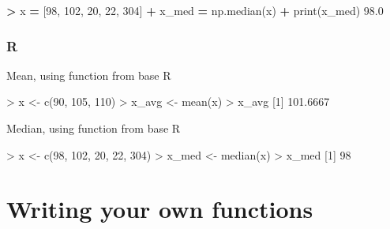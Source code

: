 \documentclass[
]{book}
\newenvironment{Shaded}{\begin{snugshade}}{\end{snugshade}}
\newcommand{\BuiltInTok}[1]{#1}
\newcommand{\DecValTok}[1]{\textcolor[rgb]{0.00,0.00,0.81}{#1}}
\newcommand{\FloatTok}[1]{\textcolor[rgb]{0.00,0.00,0.81}{#1}}
\newcommand{\FunctionTok}[1]{\textcolor[rgb]{0.00,0.00,0.00}{#1}}
\newcommand{\NormalTok}[1]{#1}
\newcommand{\OperatorTok}[1]{\textcolor[rgb]{0.81,0.36,0.00}{\textbf{#1}}}
\newcommand{\OtherTok}[1]{\textcolor[rgb]{0.56,0.35,0.01}{#1}}
\newcommand{\SpecialCharTok}[1]{\textcolor[rgb]{0.00,0.00,0.00}{#1}}
\begin{document}
\begin{Shaded}
\begin{Highlighting}[]
\OperatorTok{\textgreater{}}\NormalTok{ x }\OperatorTok{=}\NormalTok{ [}\DecValTok{98}\NormalTok{, }\DecValTok{102}\NormalTok{, }\DecValTok{20}\NormalTok{, }\DecValTok{22}\NormalTok{, }\DecValTok{304}\NormalTok{]}
\OperatorTok{+}\NormalTok{ x\_med }\OperatorTok{=}\NormalTok{ np.median(x)}
\OperatorTok{+} \BuiltInTok{print}\NormalTok{(x\_med)}
\FloatTok{98.0}
\end{Highlighting}
\end{Shaded}

\hypertarget{r-6}{%
\subsubsection*{R}\label{r-6}}

Mean, using function from base R

\begin{Shaded}
\begin{Highlighting}[]
\SpecialCharTok{\textgreater{}}\NormalTok{ x }\OtherTok{\textless{}{-}} \FunctionTok{c}\NormalTok{(}\DecValTok{90}\NormalTok{, }\DecValTok{105}\NormalTok{, }\DecValTok{110}\NormalTok{)}
\SpecialCharTok{\textgreater{}}\NormalTok{ x\_avg }\OtherTok{\textless{}{-}} \FunctionTok{mean}\NormalTok{(x)}
\SpecialCharTok{\textgreater{}}\NormalTok{ x\_avg}
\NormalTok{[}\DecValTok{1}\NormalTok{] }\FloatTok{101.6667}
\end{Highlighting}
\end{Shaded}

Median, using function from base R

\begin{Shaded}
\begin{Highlighting}[]
\SpecialCharTok{\textgreater{}}\NormalTok{ x }\OtherTok{\textless{}{-}} \FunctionTok{c}\NormalTok{(}\DecValTok{98}\NormalTok{, }\DecValTok{102}\NormalTok{, }\DecValTok{20}\NormalTok{, }\DecValTok{22}\NormalTok{, }\DecValTok{304}\NormalTok{)}
\SpecialCharTok{\textgreater{}}\NormalTok{ x\_med }\OtherTok{\textless{}{-}} \FunctionTok{median}\NormalTok{(x)}
\SpecialCharTok{\textgreater{}}\NormalTok{ x\_med}
\NormalTok{[}\DecValTok{1}\NormalTok{] }\DecValTok{98}
\end{Highlighting}
\end{Shaded}

\hypertarget{writing-your-own-functions}{%
\section{Writing your own functions}\label{writing-your-own-functions}}
\end{document}
